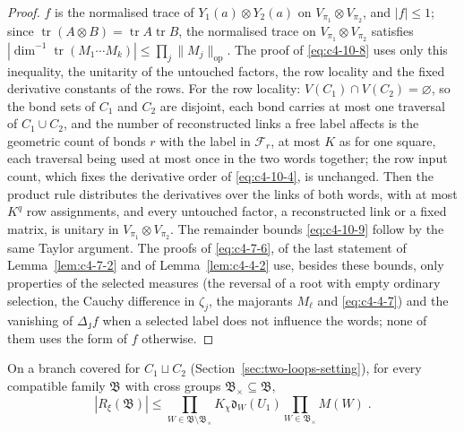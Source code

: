 \begin{proof}
$f$ is the normalised trace of $Y_1(a)\otimes Y_2(a)$ on $V_{\pi_1}\otimes V_{\pi_2}$, and $|f|\leq1$; since $\operatorname{tr}(A\otimes B)=\operatorname{tr}A\operatorname{tr}B$, the normalised trace on $V_{\pi_1}\otimes V_{\pi_2}$ satisfies $|\dim^{-1}\operatorname{tr}(M_1\cdots M_k)|\leq\prod_j\|M_j\|_{\mathrm{op}}$. The proof of \eqref{eq:c4-10-8} uses only this inequality, the unitarity of the untouched factors, the row locality and the fixed derivative constants of the rows. For the row locality: $V(C_1)\cap V(C_2)=\varnothing$, so the bond sets of $C_1$ and $C_2$ are disjoint, each bond carries at most one traversal of $C_1\cup C_2$, and the number of reconstructed links a free label affects is the geometric count of bonds $r$ with the label in $\mathcal F_r$, at most $K$ as for one square, each traversal being used at most once in the two words together; the row input count, which fixes the derivative order of \eqref{eq:c4-10-4}, is unchanged. Then the product rule distributes the derivatives over the links of both words, with at most $K^q$ row assignments, and every untouched factor, a reconstructed link or a fixed matrix, is unitary in $V_{\pi_1}\otimes V_{\pi_2}$. The remainder bounds \eqref{eq:c4-10-9} follow by the same Taylor argument. The proofs of \eqref{eq:c4-7-6}, of the last statement of Lemma~\ref{lem:c4-7-2} and of Lemma~\ref{lem:c4-4-2} use, besides these bounds, only properties of the selected measures (the reversal of a root with empty ordinary selection, the Cauchy difference in $\zeta_j$, the majorants $M_\ell$ and \eqref{eq:c4-4-7}) and the vanishing of $\Delta_{\mathsf J}f$ when a selected label does not influence the words; none of them uses the form of $f$ otherwise.
\end{proof}

\begin{lemma}\label{lem:two-loop-defect}
On a branch covered for $C_1\sqcup C_2$ (Section~\ref{sec:two-loops-setting}), for every compatible family $\mathfrak B$ with cross groups $\mathfrak B_\times\subseteq\mathfrak B$,
\begin{equation}\label{eq:two-loop-defect}
    |R_\xi(\mathfrak B)|\leq\prod_{W\in\mathfrak B\setminus\mathfrak B_\times}K_\chi\mathfrak d_W(U_1)\prod_{W\in\mathfrak B_\times}M(W)\;.
\end{equation}
\end{lemma}

